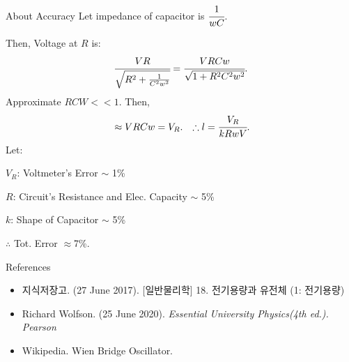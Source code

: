 \documentclass{beamer}
\begin{document}
\begin{frame}{About Accuracy}
    Let impedance of capacitor is $\cfrac{1}{wC}$.

    Then, Voltage at $R$ is:
    \begin{equation}
        \nonumber \cfrac{VR}{\sqrt{R^2+\frac{1}{C^2w^2}}}=\cfrac{VRCw}{\sqrt{1+R^2C^2w^2}}.
    \end{equation}
    Approximate $RCW<<1.$ Then, 
    \begin{align}
        \nonumber &\approx VRCw=V_R.
        \nonumber &\therefore l=\cfrac{V_R}{kRwV}.
    \end{align}
    Let: 
    
    $V_R$: Voltmeter's Error $\sim$ 1\%

    $R$: Circuit's Resistance and Elec. Capacity $\sim$ 5\% 

    $k$: Shape of Capacitor $\sim$ 5\%

    $\therefore$ Tot. Error $\approx$7\%.
\end{frame}

\begin{frame}{References}
    \begin{itemize} 
        \item 지식저장고. (27 June 2017). [일반물리학] 18. 전기용량과 유전체 (1: 전기용량)
        \item Richard Wolfson. (25 June 2020). \textit{Essential University Physics(4th ed.). Pearson}
        \item Wikipedia. Wien Bridge Oscillator.
    \end{itemize}
\end{frame}
\end{document}
